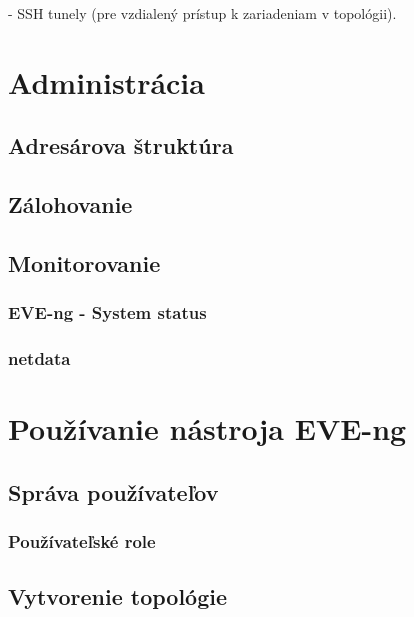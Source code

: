 - SSH tunely (pre vzdialený prístup k zariadeniam v topológii).

\section{Administrácia}

\subsection{Adresárova štruktúra}

\subsection{Zálohovanie}

\subsection{Monitorovanie}

\subsubsection{EVE-ng - System status}

\subsubsection{netdata}

\section{Používanie nástroja EVE-ng}

\subsection{Správa používateľov}

\subsubsection{Používateľské role}

\subsection{Vytvorenie topológie}
